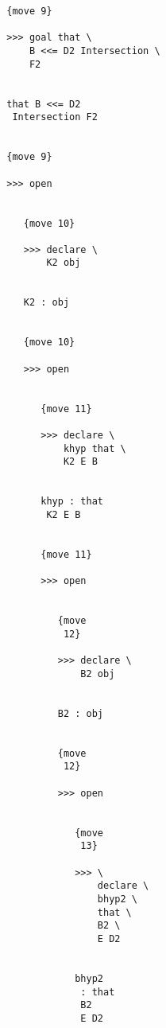\documentclass[12pt]{article}
\begin{document}
\begin{verbatim}
                           {move 9}

                           >>> goal that \
                               B <<= D2 Intersection \
                               F2


                           that B <<= D2 
                            Intersection F2


                           {move 9}

                           >>> open


                              {move 10}

                              >>> declare \
                                  K2 obj


                              K2 : obj


                              {move 10}

                              >>> open


                                 {move 11}

                                 >>> declare \
                                     khyp that \
                                     K2 E B


                                 khyp : that 
                                  K2 E B


                                 {move 11}

                                 >>> open


                                    {move 
                                     12}

                                    >>> declare \
                                        B2 obj


                                    B2 : obj


                                    {move 
                                     12}

                                    >>> open


                                       {move 
                                        13}

                                       >>> \
                                           declare \
                                           bhyp2 \
                                           that \
                                           B2 \
                                           E D2


                                       bhyp2 
                                        : that 
                                        B2 
                                        E D2



\end{verbatim}
\end{document}
